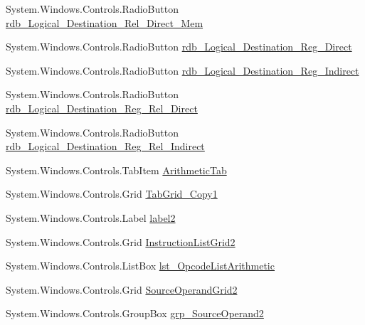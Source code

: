 \begin{DoxyCompactItemize}
System.\+Windows.\+Controls.\+Radio\+Button \hyperlink{class_c_p_u___o_s___simulator_1_1_instructions_window_acd6d03ec485f9be2de024cfc1b584475}{rdb\+\_\+\+Logical\+\_\+\+Destination\+\_\+\+Rel\+\_\+\+Direct\+\_\+\+Mem}
\item 
System.\+Windows.\+Controls.\+Radio\+Button \hyperlink{class_c_p_u___o_s___simulator_1_1_instructions_window_ad5d9ad666a574b9ee4a7eb53972f8823}{rdb\+\_\+\+Logical\+\_\+\+Destination\+\_\+\+Reg\+\_\+\+Direct}
\item 
System.\+Windows.\+Controls.\+Radio\+Button \hyperlink{class_c_p_u___o_s___simulator_1_1_instructions_window_aca35364c16ba9be919a3c793c502115c}{rdb\+\_\+\+Logical\+\_\+\+Destination\+\_\+\+Reg\+\_\+\+Indirect}
\item 
System.\+Windows.\+Controls.\+Radio\+Button \hyperlink{class_c_p_u___o_s___simulator_1_1_instructions_window_a62d6fc1ef505eb1c664a10baee1cf3ee}{rdb\+\_\+\+Logical\+\_\+\+Destination\+\_\+\+Reg\+\_\+\+Rel\+\_\+\+Direct}
\item 
System.\+Windows.\+Controls.\+Radio\+Button \hyperlink{class_c_p_u___o_s___simulator_1_1_instructions_window_a15e719fa32d2cdb7b0f1aaa6ab2d6300}{rdb\+\_\+\+Logical\+\_\+\+Destination\+\_\+\+Reg\+\_\+\+Rel\+\_\+\+Indirect}
\item 
System.\+Windows.\+Controls.\+Tab\+Item \hyperlink{class_c_p_u___o_s___simulator_1_1_instructions_window_aabf61d7cbf8be85bb4ab0ef2d0614b46}{Arithmetic\+Tab}
\item 
System.\+Windows.\+Controls.\+Grid \hyperlink{class_c_p_u___o_s___simulator_1_1_instructions_window_a834965d0ae6a57edb71a818dca188a30}{Tab\+Grid\+\_\+\+Copy1}
\item 
System.\+Windows.\+Controls.\+Label \hyperlink{class_c_p_u___o_s___simulator_1_1_instructions_window_a237621e58e68c4a07cdf8803cc1614fd}{label2}
\item 
System.\+Windows.\+Controls.\+Grid \hyperlink{class_c_p_u___o_s___simulator_1_1_instructions_window_a33108da9779c5108fc5dd303a8d33454}{Instruction\+List\+Grid2}
\item 
System.\+Windows.\+Controls.\+List\+Box \hyperlink{class_c_p_u___o_s___simulator_1_1_instructions_window_a7445b276d3723f67ba564038940d44c5}{lst\+\_\+\+Opcode\+List\+Arithmetic}
\item 
System.\+Windows.\+Controls.\+Grid \hyperlink{class_c_p_u___o_s___simulator_1_1_instructions_window_a715ed01337540f316f39fe42c373c602}{Source\+Operand\+Grid2}
\item 
System.\+Windows.\+Controls.\+Group\+Box \hyperlink{class_c_p_u___o_s___simulator_1_1_instructions_window_ad37aae3614abd76749236a7739fbc18b}{grp\+\_\+\+Source\+Operand2}

\end{DoxyCompactItemize}
